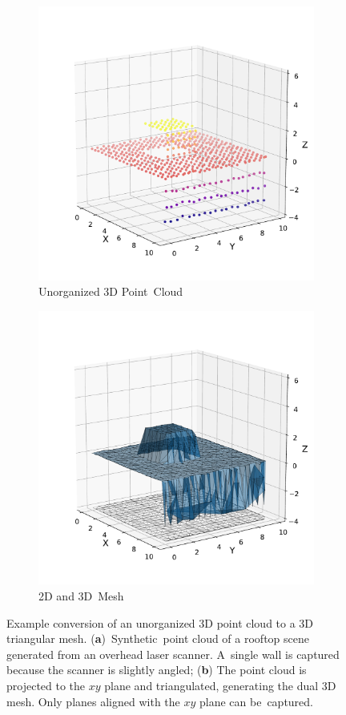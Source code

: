 \vspace{-6pt}

\begin{figure}[H]
\centering
  \begin{subfigure}{.48\linewidth}
    \centering\includegraphics[width=.65\linewidth]{chapter_3_polylidar3d/imgs/Basic25DAlgorithm_pointcloud.pdf}
    \caption{\label{fig:ch3_25DPoints}Unorganized 3D Point~Cloud}\vspace{6pt}
  \end{subfigure}
  \begin{subfigure}{.48\linewidth}
    \centering\includegraphics[width=.65\linewidth]{chapter_3_polylidar3d/imgs/Basic25DAlgorithm_mesh.pdf}
    \caption{\label{fig:ch3_25DMesh}2D and 3D~Mesh}\vspace{6pt}
  \end{subfigure}
  \caption[Converting an unorganized 3D point cloud to a 3D triangular mesh]{Example conversion of an unorganized 3D point cloud to a 3D triangular mesh. (\textbf{a})~Synthetic~point cloud of a  rooftop scene generated from an overhead laser scanner. A~single wall is captured because the scanner is slightly angled; (\textbf{b}) The point cloud is projected to the $xy$ plane and triangulated, generating the dual 3D mesh. Only planes aligned with the $xy$ plane can be~captured.  }\label{fig:ch3_25DMeshCreation}
\end{figure}

